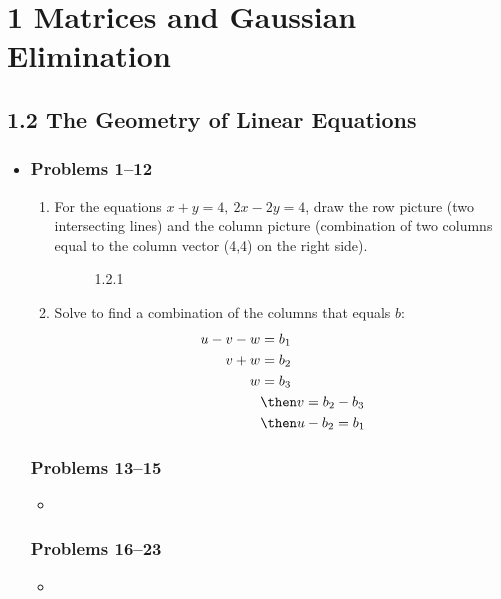 \chapter{1 Matrices and Gaussian Elimination}

\section{1.2 The Geometry of Linear Equations}
\begin{itemize}
  \item []

  \subsection{Problems 1--12}
  \begin{enumerate}
    \item For the equations \( x + y = 4, ~ 2x - 2y = 4 \), draw the row picture (two
      intersecting lines) and the column picture (combination of two columns
      equal to the column vector (4,4) on the right side).

      \begin{figure}[ht]
          \centering
          \caption{1.2.1}
      \end{figure}

    \item Solve to find a combination of the columns that equals \(b\):
      \begin{align*}
        u - v - w &= b_1 \\
        v + w &= b_2 \\
        w &= b_3 \\
          &\then v = b_2 - b_3 \\
          &\then u - b_2 = b_1 \\
      \end{align*}

  \end{enumerate}

  \subsection{Problems 13--15}
  \begin{itemize}
    \item
  \end{itemize}

  \subsection{Problems 16--23}
  \begin{itemize}
    \item
  \end{itemize}

\end{itemize}

